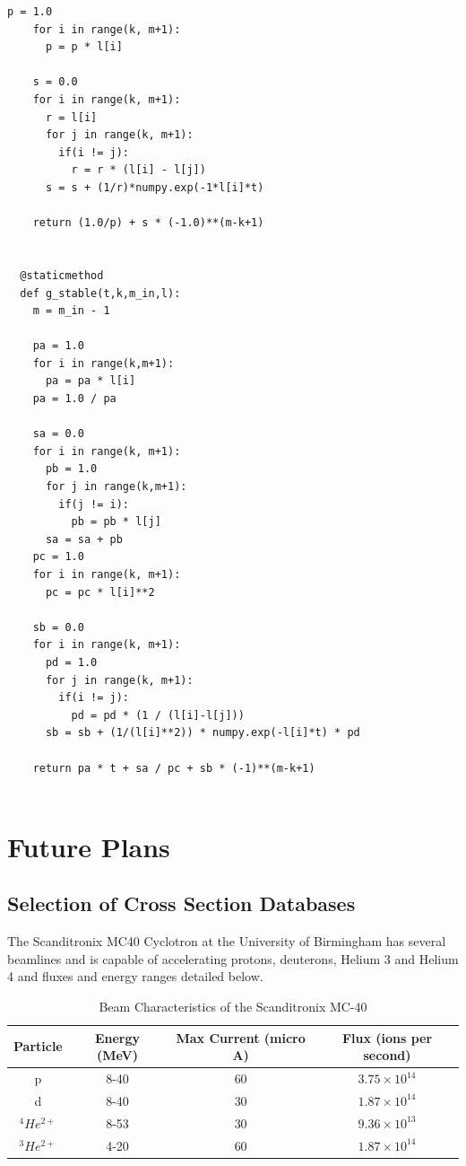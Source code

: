 \documentclass[12pt,twoside]{manual}
\begin{document}
\begin{lstlisting}[style=spython, caption={}]
    p = 1.0
    for i in range(k, m+1):
      p = p * l[i]

    s = 0.0
    for i in range(k, m+1):
      r = l[i]
      for j in range(k, m+1):
        if(i != j):
          r = r * (l[i] - l[j])
      s = s + (1/r)*numpy.exp(-1*l[i]*t)
   
    return (1.0/p) + s * (-1.0)**(m-k+1)


  @staticmethod
  def g_stable(t,k,m_in,l):
    m = m_in - 1

    pa = 1.0
    for i in range(k,m+1):
      pa = pa * l[i]
    pa = 1.0 / pa

    sa = 0.0
    for i in range(k, m+1):
      pb = 1.0
      for j in range(k,m+1):
        if(j != i):
          pb = pb * l[j]
      sa = sa + pb
    pc = 1.0 
    for i in range(k, m+1):
      pc = pc * l[i]**2

    sb = 0.0
    for i in range(k, m+1):
      pd = 1.0
      for j in range(k, m+1):
        if(i != j):
          pd = pd * (1 / (l[i]-l[j]))
      sb = sb + (1/(l[i]**2)) * numpy.exp(-l[i]*t) * pd

    return pa * t + sa / pc + sb * (-1)**(m-k+1)  
      
\end{lstlisting}










\chapter{Future Plans}

\section{Selection of Cross Section Databases}

The Scanditronix MC40 Cyclotron at the University of Birmingham has several beamlines and is capable of accelerating protons, deuterons, Helium 3 and Helium 4 and fluxes and energy ranges detailed below.  

\begin{table}[h]
\begin{center}
\begin{tabular}{c c c c}
\hline
Particle & Energy (MeV) & Max Current (micro A) & Flux (ions per second)\\
\hline
p & 8-40 & 60 & $3.75 \times 10^14$ \\
d & 8-40 & 30 & $1.87 \times 10^14$ \\
${}^4 He^{2+}$ & 8-53 & 30 & $9.36 \times 10^13$ \\
${}^3 He^{2+}$ & 4-20 & 60 & $1.87 \times 10^14$ \\
\end{tabular}
\end{center}
\caption{Beam Characteristics of the Scanditronix MC-40}
\end{table}
\end{document}
